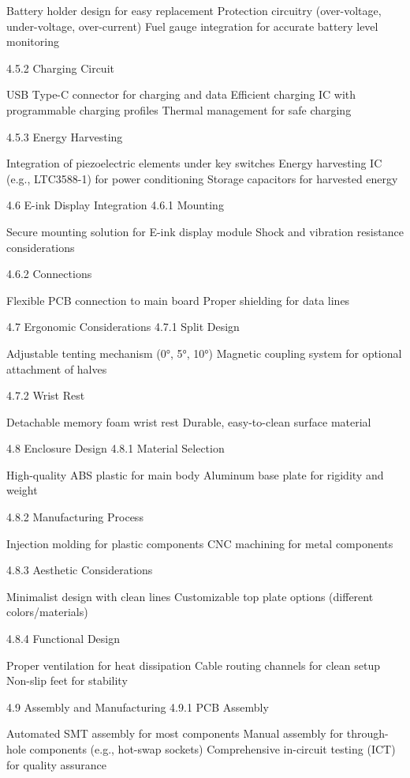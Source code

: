 \documentclass[a4paper,11pt]{article}%
\begin{document}
Battery holder design for easy replacement
Protection circuitry (over-voltage, under-voltage, over-current)
Fuel gauge integration for accurate battery level monitoring

4.5.2 Charging Circuit

USB Type-C connector for charging and data
Efficient charging IC with programmable charging profiles
Thermal management for safe charging

4.5.3 Energy Harvesting

Integration of piezoelectric elements under key switches
Energy harvesting IC (e.g., LTC3588-1) for power conditioning
Storage capacitors for harvested energy

4.6 E-ink Display Integration
4.6.1 Mounting

Secure mounting solution for E-ink display module
Shock and vibration resistance considerations

4.6.2 Connections

Flexible PCB connection to main board
Proper shielding for data lines

4.7 Ergonomic Considerations
4.7.1 Split Design

Adjustable tenting mechanism (0°, 5°, 10°)
Magnetic coupling system for optional attachment of halves

4.7.2 Wrist Rest

Detachable memory foam wrist rest
Durable, easy-to-clean surface material

4.8 Enclosure Design
4.8.1 Material Selection

High-quality ABS plastic for main body
Aluminum base plate for rigidity and weight

4.8.2 Manufacturing Process

Injection molding for plastic components
CNC machining for metal components

4.8.3 Aesthetic Considerations

Minimalist design with clean lines
Customizable top plate options (different colors/materials)

4.8.4 Functional Design

Proper ventilation for heat dissipation
Cable routing channels for clean setup
Non-slip feet for stability

4.9 Assembly and Manufacturing
4.9.1 PCB Assembly

Automated SMT assembly for most components
Manual assembly for through-hole components (e.g., hot-swap sockets)
Comprehensive in-circuit testing (ICT) for quality assurance
\end{document}
